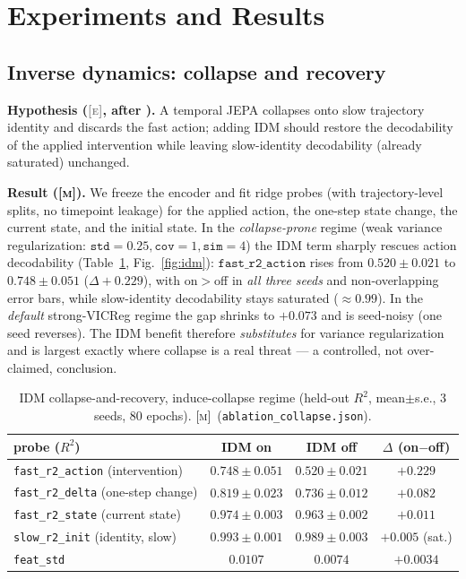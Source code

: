 \documentclass[11pt]{article}
\newcommand{\meas}{\textcolor{black}{\textsc{[m]}}}      %
\newcommand{\expd}{\textcolor{gray}{\textsc{[e]}}}       %
\newcommand{\code}[1]{\texttt{#1}}
\begin{document}
\section{Experiments and Results}

\subsection{Inverse dynamics: collapse and recovery}
\label{sec:idm}
\textbf{Hypothesis (\expd, after \cite{sobal2022}).} A temporal JEPA collapses
onto slow trajectory identity and discards the fast action; adding IDM should
restore the decodability of the applied intervention while leaving slow-identity
decodability (already saturated) unchanged.

\textbf{Result (\meas).} We freeze the encoder and fit ridge probes (with
trajectory-level splits, no timepoint leakage) for the applied action, the
one-step state change, the current state, and the initial state. In the
\emph{collapse-prone} regime (weak variance regularization:
$\code{std}{=}0.25,\code{cov}{=}1,\code{sim}{=}4$) the IDM term sharply rescues
action decodability (Table~\ref{tab:idm}, Fig.~\ref{fig:idm}):
$\code{fast\_r2\_action}$ rises from $0.520\pm0.021$ to $0.748\pm0.051$
($\Delta{+}0.229$), with on${>}$off in \emph{all three seeds} and
non-overlapping error bars, while slow-identity decodability stays saturated
($\approx0.99$). In the \emph{default} strong-VICReg regime the gap shrinks to
$+0.073$ and is seed-noisy (one seed reverses). The IDM benefit therefore
\emph{substitutes} for variance regularization and is largest exactly where
collapse is a real threat --- a controlled, not over-claimed, conclusion.

\begin{table}[h]
\centering
\caption{IDM collapse-and-recovery, induce-collapse regime (held-out $R^2$,
mean$\pm$s.e., 3 seeds, 80 epochs). \meas\ (\code{ablation\_collapse.json}).}
\label{tab:idm}
\begin{tabular}{lccc}
\toprule
probe ($R^2$) & IDM on & IDM off & $\Delta$ (on$-$off) \\
\midrule
\code{fast\_r2\_action} (intervention) & $\mathbf{0.748\pm0.051}$ & $\mathbf{0.520\pm0.021}$ & $\mathbf{+0.229}$ \\
\code{fast\_r2\_delta} (one-step change) & $0.819\pm0.023$ & $0.736\pm0.012$ & $+0.082$ \\
\code{fast\_r2\_state} (current state)   & $0.974\pm0.003$ & $0.963\pm0.002$ & $+0.011$ \\
\code{slow\_r2\_init} (identity, slow)   & $0.993\pm0.001$ & $0.989\pm0.003$ & $+0.005$ (sat.) \\
\code{feat\_std}                         & $0.0107$ & $0.0074$ & $+0.0034$ \\
\bottomrule
\end{tabular}
\end{table}
\end{document}
